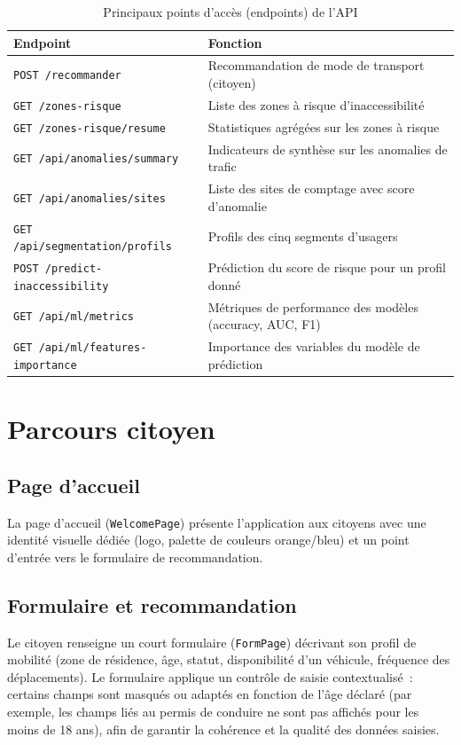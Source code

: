 \begin{table}[H]
\centering
\caption{Principaux points d'accès (endpoints) de l'API}
\begin{tabular}{lp{8cm}}
\toprule
\textbf{Endpoint} & \textbf{Fonction} \\
\midrule
\texttt{POST /recommander} & Recommandation de mode de transport (citoyen) \\
\texttt{GET /zones-risque} & Liste des zones à risque d'inaccessibilité \\
\texttt{GET /zones-risque/resume} & Statistiques agrégées sur les zones à risque \\
\texttt{GET /api/anomalies/summary} & Indicateurs de synthèse sur les anomalies de trafic \\
\texttt{GET /api/anomalies/sites} & Liste des sites de comptage avec score d'anomalie \\
\texttt{GET /api/segmentation/profils} & Profils des cinq segments d'usagers \\
\texttt{POST /predict-inaccessibility} & Prédiction du score de risque pour un profil donné \\
\texttt{GET /api/ml/metrics} & Métriques de performance des modèles (accuracy, AUC, F1) \\
\texttt{GET /api/ml/features-importance} & Importance des variables du modèle de prédiction \\
\bottomrule
\end{tabular}
\end{table}

\section{Parcours citoyen}

\subsection{Page d'accueil}
La page d'accueil (\texttt{WelcomePage}) présente l'application aux citoyens avec une identité visuelle dédiée (logo, palette de couleurs orange/bleu) et un point d'entrée vers le formulaire de recommandation.

\subsection{Formulaire et recommandation}
Le citoyen renseigne un court formulaire (\texttt{FormPage}) décrivant son profil de mobilité (zone de résidence, âge, statut, disponibilité d'un véhicule, fréquence des déplacements). Le formulaire applique un contrôle de saisie contextualisé~: certains champs sont masqués ou adaptés en fonction de l'âge déclaré (par exemple, les champs liés au permis de conduire ne sont pas affichés pour les moins de 18 ans), afin de garantir la cohérence et la qualité des données saisies.


